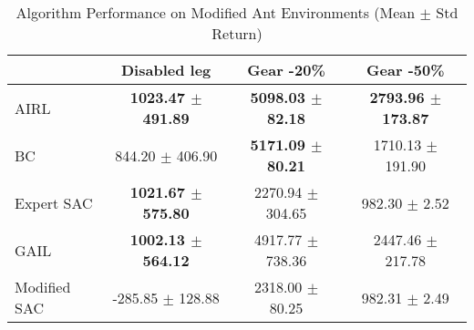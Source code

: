 \documentclass{article}
\begin{document}
\pagestyle{empty}

\begin{table}
\caption{Algorithm Performance on Modified Ant Environments (Mean $\pm$ Std Return)}
\label{tab:perf_mod_ant}
\begin{adjustbox}{max width=\textwidth, center}
\begin{tabular}{lccc}
\toprule
 & Disabled leg & Gear -20\% & Gear -50\% \\
\midrule
AIRL & \textbf{1023.47 $\pm$ 491.89} & \textbf{5098.03 $\pm$ 82.18} & \textbf{2793.96 $\pm$ 173.87} \\
BC & 844.20 $\pm$ 406.90 & \textbf{5171.09 $\pm$ 80.21} & 1710.13 $\pm$ 191.90 \\
Expert SAC & \textbf{1021.67 $\pm$ 575.80} & 2270.94 $\pm$ 304.65 & 982.30 $\pm$ 2.52 \\
GAIL & \textbf{1002.13 $\pm$ 564.12} & 4917.77 $\pm$ 738.36 & 2447.46 $\pm$ 217.78 \\
Modified SAC & -285.85 $\pm$ 128.88 & 2318.00 $\pm$ 80.25 & 982.31 $\pm$ 2.49 \\
\bottomrule
\end{tabular}
\end{adjustbox}
\end{table}
\end{document}
